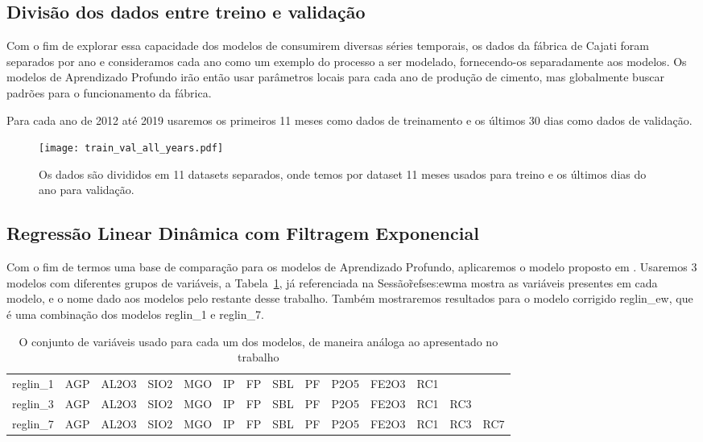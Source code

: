 \subsection{Divisão dos dados entre treino e validação}

Com o fim de explorar essa capacidade dos modelos de consumirem diversas séries
temporais, os dados da fábrica de Cajati foram separados por ano e consideramos
cada ano como um exemplo do processo a ser modelado, fornecendo-os separadamente
aos modelos. Os modelos de Aprendizado
Profundo irão então usar parâmetros locais para cada ano de produção de cimento,
mas globalmente buscar padrões para o funcionamento da fábrica. 

Para cada ano de 2012 até 2019 usaremos os primeiros 11 meses como dados de
treinamento e os últimos 30 dias como dados de validação.


\begin{figure}[H]
  \centering
  \texttt{[image: train\_val\_all\_years.pdf]} 
  \caption{Os dados são divididos em 11 datasets separados, onde temos por
    dataset 11 meses usados para treino e os últimos dias do ano para validação.} 
  \label{fig:trainvalallyears}
\end{figure}

\subsection{Regressão Linear Dinâmica com Filtragem Exponencial}

Com o fim de termos uma base de comparação para os modelos de
Aprendizado Profundo, aplicaremos o modelo proposto em \citep{grecialin}.
Usaremos 3 modelos com diferentes grupos de variáveis, a
Tabela~\ref{tab:modelslin}, já referenciada na Sessão\~ref{ses:ewma} mostra
as variáveis presentes em cada modelo, e o nome dado aos modelos pelo restante
desse trabalho. Também mostraremos resultados para o modelo corrigido
reglin\_ew, que é uma combinação dos modelos reglin\_1 e reglin\_7.


\begin{table}[]
\centering 
\begin{tabular}{llllllllllllll}
\toprule
reglin\_1 &  AGP &  AL2O3 &  SIO2 &  MGO &  IP &  FP &  SBL &  PF &  P2O5 &  FE2O3 &  RC1 &      &      \\
reglin\_3 &  AGP &  AL2O3 &  SIO2 &  MGO &  IP &  FP &  SBL &  PF &  P2O5 &  FE2O3 &  RC1 &  RC3 &      \\
reglin\_7 &  AGP &  AL2O3 &  SIO2 &  MGO &  IP &  FP &  SBL &  PF &  P2O5 &  FE2O3 &  RC1 &  RC3 &  RC7 \\
\bottomrule
\end{tabular}
\caption{O conjunto de variáveis usado para cada um dos modelos, de maneira análoga ao apresentado no trabalho \cite{grecialin}}
\label{tab:modelslin}
\end{table}


